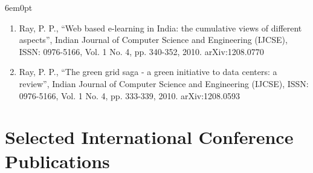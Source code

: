 \documentclass[11pt,a4paper]{moderncv}
\begin{document}
\begin{adjustwidth}{6em}{0pt}
\begin{enumerate}
		\item Ray, P. P., “Web based e-learning in India: the cumulative views of different aspects”, Indian Journal of Computer Science and Engineering (IJCSE), ISSN: 0976-5166, Vol. 1 No. 4, pp. 340-352, 2010. arXiv:1208.0770
		
		\item Ray, P. P., “The green grid saga - a green initiative to data centers: a review”, Indian Journal of  Computer Science and Engineering (IJCSE), ISSN: 0976-5166, Vol. 1 No. 4, pp. 333-339, 2010. arXiv:1208.0593
		
		
	\end{enumerate}
\end{adjustwidth}



\section{\textbf{Selected International Conference Publications}}
\end{document}
